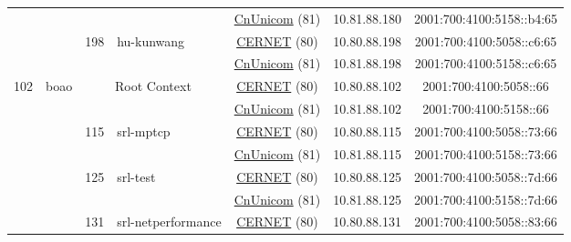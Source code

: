 \begin{small}
\begin{center}
\begin{longtable}{|c|c|c|c|c|c|c|c|}
  &  &  &  & \multicolumn{2}{|c|}{\tiny{\href{http://www.chinaunicom.com}{CnUnicom} (81)}} & \tiny{10.81.88.180} & \tiny{2001:700:4100:5158::b4:65} \\* \cline{3-3}\cline{4-4}\cline{5-5}\cline{6-6}\cline{7-7}\cline{8-8}
  &  & \multirow{2}{*}{\tiny{198}} & \multicolumn{1}{|l|}{\multirow{2}{*}{\tiny{hu-kunwang}}} & \multicolumn{2}{|c|}{\tiny{\href{http://www.cernet.edu.cn}{CERNET} (80)}} & \tiny{10.80.88.198} & \tiny{2001:700:4100:5058::c6:65} \\* \cline{5-5}\cline{6-6}\cline{7-7}\cline{8-8}
  &  &  &  & \multicolumn{2}{|c|}{\tiny{\href{http://www.chinaunicom.com}{CnUnicom} (81)}} & \tiny{10.81.88.198} & \tiny{2001:700:4100:5158::c6:65} \\ \hline
 \multirow{28}{*}{\tiny{102}} & \multicolumn{1}{|l|}{\multirow{28}{*}{\tiny{boao}}} & \multicolumn{2}{|c|}{\multirow{2}{*}{\tiny{Root Context}}} & \multicolumn{2}{|c|}{\tiny{\href{http://www.cernet.edu.cn}{CERNET} (80)}} & \tiny{10.80.88.102} & \tiny{2001:700:4100:5058::66} \\* \cline{5-5}\cline{6-6}\cline{7-7}\cline{8-8}
  &  & \multicolumn{2}{|c|}{} & \multicolumn{2}{|c|}{\tiny{\href{http://www.chinaunicom.com}{CnUnicom} (81)}} & \tiny{10.81.88.102} & \tiny{2001:700:4100:5158::66} \\* \cline{3-3}\cline{4-4}\cline{5-5}\cline{6-6}\cline{7-7}\cline{8-8}
  &  & \multirow{2}{*}{\tiny{115}} & \multicolumn{1}{|l|}{\multirow{2}{*}{\tiny{srl-mptcp}}} & \multicolumn{2}{|c|}{\tiny{\href{http://www.cernet.edu.cn}{CERNET} (80)}} & \tiny{10.80.88.115} & \tiny{2001:700:4100:5058::73:66} \\* \cline{5-5}\cline{6-6}\cline{7-7}\cline{8-8}
  &  &  &  & \multicolumn{2}{|c|}{\tiny{\href{http://www.chinaunicom.com}{CnUnicom} (81)}} & \tiny{10.81.88.115} & \tiny{2001:700:4100:5158::73:66} \\* \cline{3-3}\cline{4-4}\cline{5-5}\cline{6-6}\cline{7-7}\cline{8-8}
  &  & \multirow{2}{*}{\tiny{125}} & \multicolumn{1}{|l|}{\multirow{2}{*}{\tiny{srl-test}}} & \multicolumn{2}{|c|}{\tiny{\href{http://www.cernet.edu.cn}{CERNET} (80)}} & \tiny{10.80.88.125} & \tiny{2001:700:4100:5058::7d:66} \\* \cline{5-5}\cline{6-6}\cline{7-7}\cline{8-8}
  &  &  &  & \multicolumn{2}{|c|}{\tiny{\href{http://www.chinaunicom.com}{CnUnicom} (81)}} & \tiny{10.81.88.125} & \tiny{2001:700:4100:5158::7d:66} \\* \cline{3-3}\cline{4-4}\cline{5-5}\cline{6-6}\cline{7-7}\cline{8-8}
  &  & \multirow{2}{*}{\tiny{131}} & \multicolumn{1}{|l|}{\multirow{2}{*}{\tiny{srl-netperformance}}} & \multicolumn{2}{|c|}{\tiny{\href{http://www.cernet.edu.cn}{CERNET} (80)}} & \tiny{10.80.88.131} & \tiny{2001:700:4100:5058::83:66} \\* \cline{5-5}\cline{6-6}\cline{7-7}\cline{8-8}

\end{longtable}
\end{center}
\end{small}
